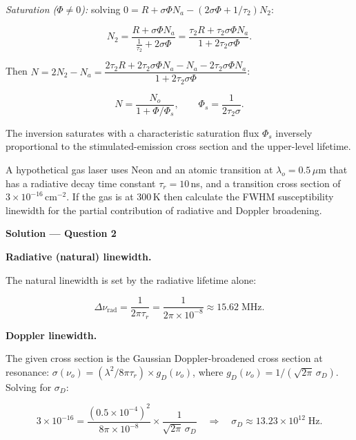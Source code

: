 \emph{Saturation ($\Phi\neq 0$):} solving $0 = R + \sigma\Phi N_a - (2\sigma\Phi + 1/\tau_2)N_2$:

\begin{equation*}
  N_2 = \frac{R + \sigma\Phi N_a}{\tfrac{1}{\tau_2}+2\sigma\Phi}
      = \frac{\tau_2 R + \tau_2\sigma\Phi N_a}{1+2\tau_2\sigma\Phi}.
\end{equation*}

Then $N = 2N_2 - N_a = \dfrac{2\tau_2 R + 2\tau_2\sigma\Phi N_a - N_a - 2\tau_2\sigma\Phi N_a}{1+2\tau_2\sigma\Phi}$:

\begin{equation*}
  \boxed{N = \frac{N_o}{1+\Phi/\Phi_s}, \qquad \Phi_s = \frac{1}{2\tau_2\sigma}.}
\end{equation*}

The inversion saturates with a characteristic saturation flux $\Phi_s$ inversely proportional to the stimulated-emission cross section and the upper-level lifetime.


\begin{question}[Question 2]A hypothetical gas laser uses Neon and an atomic transition at
$\lambda_{o}=0.5\,\mu$m that has a radiative decay time constant $\tau_{r}=10$\,ns, and a
transition cross section of $3\times10^{-16}$\,cm$^{-2}$. If the gas is at 300\,K then
calculate the FWHM susceptibility linewidth for the partial contribution of radiative and Doppler
broadening.
\end{question}

\textbf{\large Solution --- Question 2}

\textbf{Radiative (natural) linewidth.}

The natural linewidth is set by the radiative lifetime alone:

\begin{equation*}
  \Delta\nu_\text{rad} = \frac{1}{2\pi\tau_r} = \frac{1}{2\pi\times10^{-8}}
  \approx \boxed{15.62\;\text{MHz.}}
\end{equation*}

\textbf{Doppler linewidth.}

The given cross section is the Gaussian Doppler-broadened cross section at resonance:
$\sigma(\nu_o) = (\lambda^{2}/8\pi\tau_r)\times g_D(\nu_o)$, where $g_D(\nu_o)=1/(\sqrt{2\pi}\,\sigma_D)$. Solving for $\sigma_D$:

\begin{equation*}
  3\times10^{-16} = \frac{(0.5\times10^{-4})^{2}}{8\pi\times10^{-8}}\times\frac{1}{\sqrt{2\pi}\,\sigma_D}
  \quad\Longrightarrow\quad
  \sigma_D \approx 13.23\times10^{12}\;\text{Hz.}
\end{equation*}

